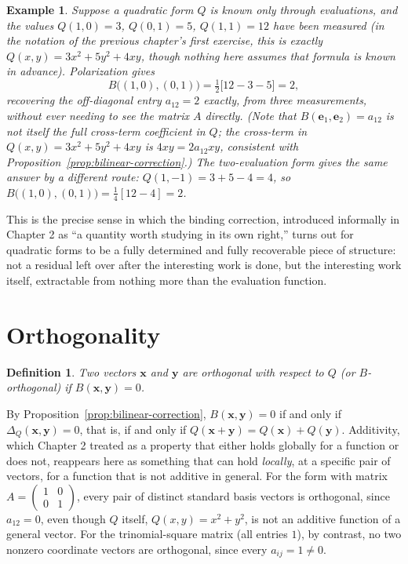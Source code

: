 \documentclass[11pt]{book}
\newtheorem{definition}[theorem]{Definition}
\newtheorem{example}[theorem]{Example}
\begin{document}
\begin{example}
Suppose a quadratic form $Q$ is known only through evaluations, and the values $Q(1,0)=3$, $Q(0,1)=5$, $Q(1,1)=12$ have been measured (in the notation of the previous chapter's first exercise, this is exactly $Q(x,y)=3x^2+5y^2+4xy$, though nothing here assumes that formula is known in advance). Polarization gives
\[
B\bigl((1,0),(0,1)\bigr) = \tfrac{1}{2}\bigl[12 - 3 - 5\bigr] = 2,
\]
recovering the off-diagonal entry $a_{12}=2$ exactly, from three measurements, without ever needing to see the matrix $A$ directly. (Note that $B(\mathbf{e}_1,\mathbf{e}_2)=a_{12}$ is not itself the full cross-term coefficient in $Q$; the cross-term in $Q(x,y)=3x^2+5y^2+4xy$ is $4xy=2a_{12}xy$, consistent with Proposition~\ref{prop:bilinear-correction}.) The two-evaluation form gives the same answer by a different route: $Q(1,-1)=3+5-4=4$, so $B\bigl((1,0),(0,1)\bigr)=\tfrac14[12-4]=2$.
\end{example}

This is the precise sense in which the binding correction, introduced informally in Chapter 2 as ``a quantity worth studying in its own right,'' turns out for quadratic forms to be a fully determined and fully recoverable piece of structure: not a residual left over after the interesting work is done, but the interesting work itself, extractable from nothing more than the evaluation function.

\section{Orthogonality}

\begin{definition}
Two vectors $\mathbf{x}$ and $\mathbf{y}$ are \emph{orthogonal with respect to $Q$} (or $B$-orthogonal) if $B(\mathbf{x},\mathbf{y})=0$.
\end{definition}

By Proposition~\ref{prop:bilinear-correction}, $B(\mathbf{x},\mathbf{y})=0$ if and only if $\Delta_Q(\mathbf{x},\mathbf{y})=0$, that is, if and only if $Q(\mathbf{x}+\mathbf{y})=Q(\mathbf{x})+Q(\mathbf{y})$. Additivity, which Chapter 2 treated as a property that either holds globally for a function or does not, reappears here as something that can hold \emph{locally}, at a specific pair of vectors, for a function that is not additive in general. For the form with matrix $A=\begin{pmatrix}1&0\\0&1\end{pmatrix}$, every pair of distinct standard basis vectors is orthogonal, since $a_{12}=0$, even though $Q$ itself, $Q(x,y)=x^2+y^2$, is not an additive function of a general vector. For the trinomial-square matrix (all entries $1$), by contrast, no two nonzero coordinate vectors are orthogonal, since every $a_{ij}=1\ne 0$.
\end{document}
